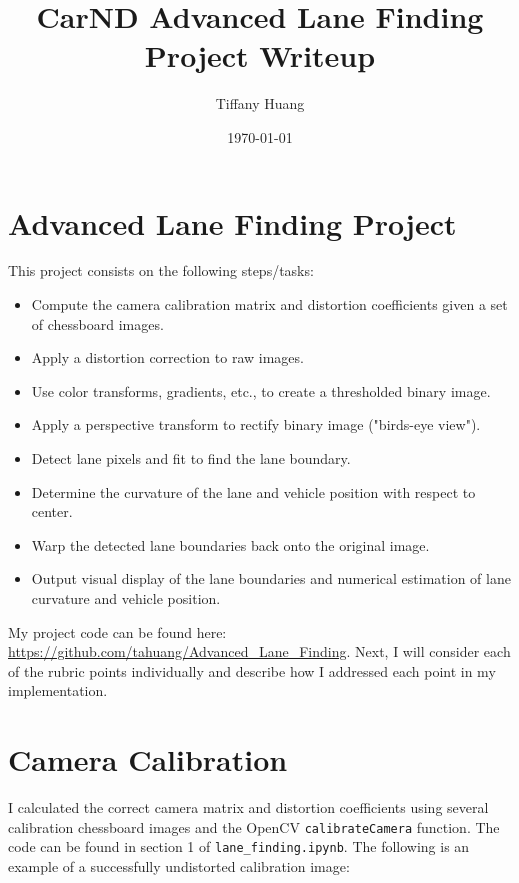 \documentclass[12pt]{article}
\title{CarND Advanced Lane Finding Project Writeup}
\author{Tiffany Huang}
\date{\today}
\begin{document}
\maketitle


\section{Advanced Lane Finding Project}
This project consists on the following steps/tasks:
\begin{itemize}
\item {Compute the camera calibration matrix and distortion coefficients given a set of chessboard images.}
\item {Apply a distortion correction to raw images.}
\item {Use color transforms, gradients, etc., to create a thresholded binary image.}
\item {Apply a perspective transform to rectify binary image ("birds-eye view").}
\item {Detect lane pixels and fit to find the lane boundary.}
\item {Determine the curvature of the lane and vehicle position with respect to center.}
\item {Warp the detected lane boundaries back onto the original image.}
\item {Output visual display of the lane boundaries and numerical estimation of lane curvature and vehicle position.}
\end{itemize}
My project code can be found here: \url{https://github.com/tahuang/Advanced_Lane_Finding}. Next, I will consider each of the rubric points individually and describe how I addressed each point in my implementation.

\section{Camera Calibration}
I calculated the correct camera matrix and distortion coefficients using several calibration chessboard images and the OpenCV \texttt{calibrateCamera} function. The code can be found in section 1 of \texttt{lane\_finding.ipynb}. The following is an example of a successfully undistorted calibration image:
\end{document}
